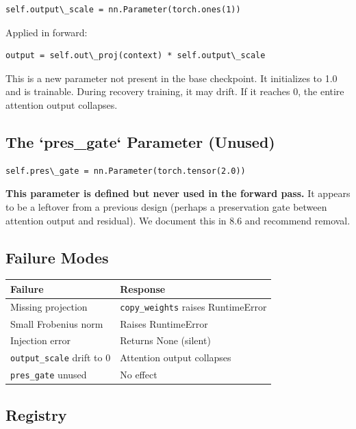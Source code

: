 \begin{lstlisting}
self.output\_scale = nn.Parameter(torch.ones(1))
\end{lstlisting}

Applied in forward:

\begin{lstlisting}
output = self.out\_proj(context) * self.output\_scale
\end{lstlisting}

This is a new parameter not present in the base checkpoint. It 
initializes to 1.0 and is trainable. During recovery training, it 
may drift. If it reaches 0, the entire attention output collapses.

\subsection{The `pres\_gate` Parameter (Unused)}

\begin{lstlisting}
self.pres\_gate = nn.Parameter(torch.tensor(2.0))
\end{lstlisting}

\textbf{This parameter is defined but never used in the forward pass.} It 
appears to be a leftover from a previous design (perhaps a preservation 
gate between attention output and residual). We document this in  8.6 
and recommend removal.

\subsection{Failure Modes}

\begin{table}[H]
\centering
\small
\begin{tabular}{ll}
\toprule
\textbf{Failure} & \textbf{Response} \\
\midrule
Missing projection & \texttt{copy\_weights} raises RuntimeError \\
Small Frobenius norm & Raises RuntimeError \\
Injection error & Returns None (silent) \\
\texttt{output\_scale} drift to 0 & Attention output collapses \\
\texttt{pres\_gate} unused & No effect \\
\bottomrule
\end{tabular}
\end{table}

\subsection{Registry}

